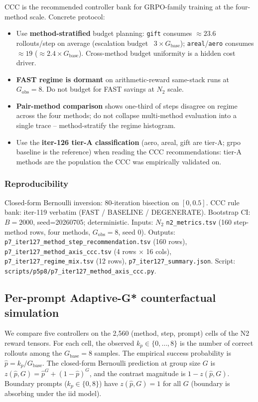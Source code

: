 \documentclass{article}
\begin{document}
CCC is the recommended controller bank for GRPO-family training at
the four-method scale.  Concrete protocol:
\begin{itemize}
\item Use \textbf{method-stratified} budget planning: \texttt{gift}
  consumes $\approx 23.6$ rollouts/step on average (escalation budget
  ~$3\times G_{\mathrm{base}}$); \texttt{areal}/\texttt{aero} consumes
  $\approx 19$ ($\approx 2.4\times G_{\mathrm{base}}$).  Cross-method
  budget uniformity is a hidden cost driver.
\item \textbf{FAST regime is dormant} on arithmetic-reward same-stack
  runs at $G_{\mathrm{obs}}{=}8$.  Do not budget for FAST savings
  at $N_2$ scale.
\item \textbf{Pair-method comparison} shows one-third of steps
  disagree on regime across the four methods; do not collapse
  multi-method evaluation into a single trace -- method-stratify
  the regime histogram.
\item Use the \textbf{iter-126 tier-A classification} (aero, areal,
  gift are tier-A; grpo baseline is the reference) when reading
  the CCC recommendations: tier-A methods are the population the
  CCC was empirically validated on.
\end{itemize}

\subsubsection*{Reproducibility}

Closed-form Bernoulli inversion: $80$-iteration bisection on
$[0, 0.5]$.  CCC rule bank: iter-119 verbatim (FAST / BASELINE /
DEGENERATE).  Bootstrap CI: $B=2000$, seed=20260705; deterministic.
Inputs: $N_2$ \texttt{n2\_metrics.tsv} (160 step-method rows,
four methods, $G_{\mathrm{obs}}{=}8$, seed 0).  Outputs:
\texttt{p7\_iter127\_method\_step\_recommendation.tsv}
(160 rows), \texttt{p7\_iter127\_method\_axis\_ccc.tsv}
(4 rows $\times$ 16 cols), \texttt{p7\_iter127\_regime\_mix.tsv}
(12 rows), \texttt{p7\_iter127\_summary.json}.  Script:
\texttt{scripts/p5p8/p7\_iter127\_method\_axis\_ccc.py}.
 \label{sec:p7-iter131-per-prompt-adaptive-gstar}


\subsection*{Per-prompt Adaptive-G* counterfactual simulation}

We compare five controllers on the 2,560 (method, step, prompt) cells of
the N2 reward tensors. For each cell, the observed $k_p \in \{0, \ldots, 8\}$
is the number of correct rollouts among the $G_{\mathrm{base}}{=}8$ samples.
The empirical success probability is $\hat{p} = k_p / G_{\mathrm{base}}$.
The closed-form Bernoulli prediction at group size $G$ is
$z(\hat{p}, G) = \hat{p}^G + (1-\hat{p})^G$, and the contrast magnitude is
$1 - z(\hat{p}, G)$. Boundary prompts ($k_p \in \{0, 8\}$) have
$z(\hat{p}, G) = 1$ for all $G$ (boundary is absorbing under the iid model).
\end{document}

